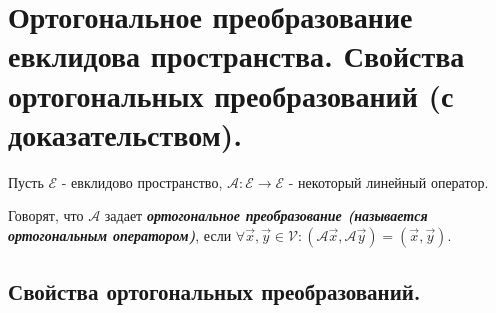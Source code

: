 \section{
    Ортогональное преобразование евклидова пространства. Свойства ортогональных преобразований (с доказательством).
}

Пусть $\mathcal{E}$ - евклидово пространство, $\mathscr{A} \colon \mathcal{E} \to \mathcal{E}$ - некоторый линейный оператор.

\begin{definition}
     Говорят, что $\mathscr{A}$ задает \textbf{\textit{ортогональное преобразование (называется ортогональным оператором)}}, если $\forall \vec{x}, \vec{y} \in \mathcal{V} \colon (\mathscr{A}\vec{x}, \mathscr{A}\vec{y}) = (\vec{x}, \vec{y})$.
\end{definition}

\subsection*{Свойства ортогональных преобразований.}


